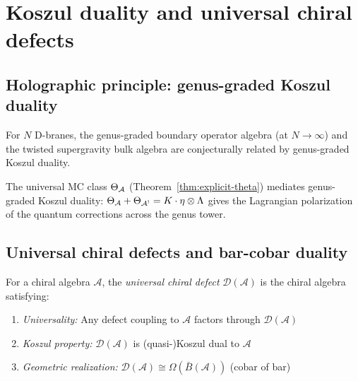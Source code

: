 
\section{Koszul duality and universal chiral defects}\label{sec:koszul-defects}

\subsection{Holographic principle: genus-graded Koszul duality}

\begin{remark}\label{principle:costello-li}
For $N$ D-branes, the genus-graded boundary operator algebra (at $N \to \infty$) and the twisted supergravity bulk algebra are conjecturally related by genus-graded Koszul duality.
\end{remark}

\begin{remark}
The universal MC class $\Theta_{\mathcal{A}}$ (Theorem~\ref{thm:explicit-theta}) mediates genus-graded Koszul duality: $\Theta_{\mathcal{A}} + \Theta_{\mathcal{A}^!} = K \cdot \eta \otimes \Lambda$ gives the Lagrangian polarization of the quantum corrections across the genus tower.
\end{remark}

\subsection{Universal chiral defects and bar-cobar duality}

\begin{definition}\label{def:universal-defect}
For a chiral algebra $\mathcal{A}$, the \emph{universal chiral defect} $\mathcal{D}(\mathcal{A})$ is the chiral algebra satisfying:
\begin{enumerate}
\item \emph{Universality:} Any defect coupling to $\mathcal{A}$ factors through $\mathcal{D}(\mathcal{A})$
\item \emph{Koszul property:} $\mathcal{D}(\mathcal{A})$ is (quasi-)Koszul dual to $\mathcal{A}$
\item \emph{Geometric realization:} $\mathcal{D}(\mathcal{A}) \cong \Omega(\bar{B}(\mathcal{A}))$ (cobar of bar)
\end{enumerate}
\end{definition}

